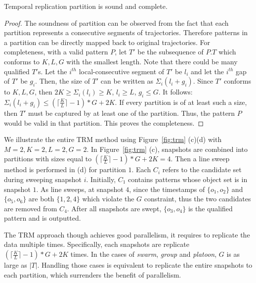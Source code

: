 \begin{theorem}
\label{thm:replication_partition}
Temporal replication partition is sound and complete.
\end{theorem}
\begin{proof}
The soundness of partition can be observed from the fact 
that each partition represents a consecutive segments of trajectories. 
Therefore patterns in a partition can be directly mapped 
back to original trajectories. For completeness, with a
valid pattern $P$, let $T'$ be the subsequence of $P.T$ which conforms to $K,L,G$ 
with the smallest length. Note that there could be many qualified $T'$s. 
Let the $i^{th}$ local-consecutive segment of $T'$ be $l_i$ and 
let the $i^{th}$ gap of $T'$ be $g_i$. Then, the size of $T'$ can 
be written as $\Sigma_i (l_i + g_i)$.  Since $T'$ conforms to $K,L,G$, 
then $2K \geq \Sigma_i (l_i) \geq K$, $l_i \geq L$, $g_i \leq G$. 
It follows: $\Sigma_i(l_i+g_i) \leq (\lceil \frac{K}{L} \rceil -1) *G+2K$. 
If every partition is of at least such a size, then $T'$ must be
captured by at least one of the partition. Thus, the pattern $P$ would 
be valid in that partition. This proves the completeness.
\end{proof}

\begin{example}
We illustrate the entire TRM method using Figure~\ref{fig:trm} (c)(d) with $M=2, K=2, L = 2, G=2$. 
In Figure~\ref{fig:trm} (c), snapshots are combined into partitions with sizes equal to 
$(\lceil \frac{K}{L} \rceil-1) *G+2K = 4$. Then a line sweep method is performed in (d) 
for partition $1$. Each $C_i$ refers to the candidate set during sweeping snapshot $i$. 
Initially, $C_1$ contains patterns whose object set is in snapshot $1$.
As line sweeps, at snapshot $4$, since the timestamps of $\{o_1,o_2\}$ and $\{o_5,o_6\}$ 
are both $\{1,2,4\}$ which violate the $G$ constraint, 
thus the two candidates are removed from $C_4$. After all snapshots are swept, 
$\{o_3,o_4\}$ is the qualified pattern and is outputted.
\end{example}

The TRM approach though achieves good parallelism, 
it requires to replicate the data multiple times. 
Specifically, each snapshots are replicate $(\lceil \frac{K}{L} \rceil -1) *G+2K$ times. 
In the cases of \emph{swarm}, \emph{group} and \emph{platoon}, $G$ is as large as $|T|$. 
Handling those cases is equivalent to replicate the entire snapshots to each partition, 
which surrenders the benefit of parallelism.



